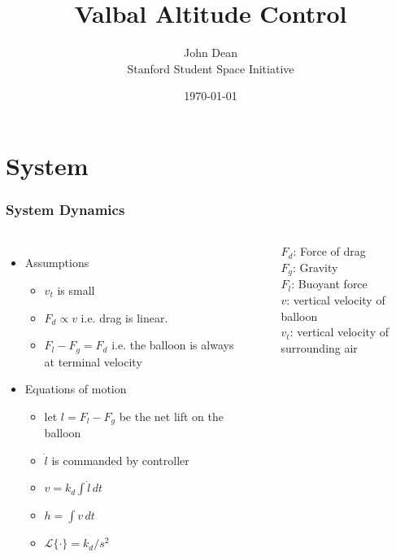 \documentclass[10pt,mathserif]{beamer}
\title{\large \bfseries Valbal Altitude Control}
\author{John Dean\\[3ex]
\small Stanford Student Space Initiative}
\date{\today}
\begin{document}
\frame{
\thispagestyle{empty}
\titlepage
}

\section{System}

\begin{frame}
\frametitle{System Dynamics}
\begin{columns}
\begin{itemize}\itemsep=12pt
\item Assumptions
\vspace*{0.5em}
\begin{itemize}
\item $v_t$ is small
\item $F_d \propto v$ i.e. drag is linear.
\item $F_l - F_g = F_d$ i.e. the balloon is always at terminal velocity 
\end{itemize}
\item Equations of motion
\vspace*{0.5em}
\begin{itemize}
\item let $l = F_l - F_g$ be the net lift on the balloon
\item $\dot l$ is commanded by controller
\item $v = k_{d} \int \dot l \, dt $
\item $h = \int v \, dt$
\item $\mathcal{L}\{\cdot\} = k_{d} / s^2$
\end{itemize}
\end{itemize}


\begin{center}
\end{center}

$F_d$: Force of drag\\
$F_g$: Gravity\\
$F_l$: Buoyant force\\
$v$: vertical velocity of balloon\\
$v_t$: vertical velocity of surrounding air
\end{columns}
\end{frame}
\end{document}
